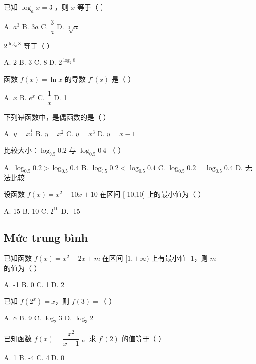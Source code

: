 \documentclass[11pt, a4paper]{article}
\begin{document}
\begin{baitap}[1]
已知 $\log_a x = 3$ ，则 $x$ 等于（ ）
\par\vspace{3pt}
\noindent A. $a^3$ \quad B. $3a$ \quad C. $\dfrac{3}{a}$ \quad D. $\sqrt[3]{a}$
\end{baitap}
\begin{baitap}[2]
$2^{\log_2 8}$ 等于（ ）
\par\vspace{3pt}
\noindent A. 2 \quad B. 3 \quad C. 8 \quad D. $2^{\log_2 8}$
\end{baitap}
\begin{baitap}[3]
函数 $f(x) = \ln x$ 的导数 $f'(x)$ 是（ ）
\par\vspace{3pt}
\noindent A. $x$ \quad B. $e^x$ \quad C. $\dfrac{1}{x}$ \quad D. 1
\end{baitap}
\begin{baitap}[4]
下列幂函数中，是偶函数的是（ ）
\par\vspace{3pt}
\noindent A. $y = x^{\frac{1}{2}}$ \quad B. $y = x^2$ \quad C. $y = x^3$ \quad D. $y = x-1$
\end{baitap}
\begin{baitap}[5]
比较大小：$\log_{0.5} 0.2$ 与 $\log_{0.5} 0.4$ （ ）
\par\vspace{3pt}
\noindent A. $\log_{0.5} 0.2 > \log_{0.5} 0.4$ \quad B. $\log_{0.5} 0.2 < \log_{0.5} 0.4$ \quad C. $\log_{0.5} 0.2 = \log_{0.5} 0.4$ \quad D. 无法比较
\end{baitap}
\begin{baitap}[6]
设函数 $f(x) = x^2 - 10x + 10$ 在区间 [-10,10] 上的最小值为（ ）
\par\vspace{3pt}
\noindent A. 15 \quad B. 10 \quad C. $2^{10}$ \quad D. -15
\end{baitap}
\subsection{Mức trung bình}

\begin{baitap}[7]
已知函数 $f(x) = x^2 - 2x + m$ 在区间 $[1, +\infty)$ 上有最小值 -1，则 $m$ 的值为（ ）
\par\vspace{3pt}
\noindent A. -1 \quad B. 0 \quad C. 1 \quad D. 2
\end{baitap}
\begin{baitap}[8]
已知 $f(2^x) = x$，则 $f(3) =$（ ）
\par\vspace{3pt}
\noindent A. 8 \quad B. 9 \quad C. $\log_2 3$ \quad D. $\log_3 2$
\end{baitap}
\begin{baitap}[9]
已知函数 $f(x) = \dfrac{x^2}{x-1}$ 。求 $f'(2)$ 的值等于（ ）
\par\vspace{3pt}
\noindent A. 1 \quad B. -4 \quad C. 4 \quad D. 0
\end{baitap}
\end{document}
